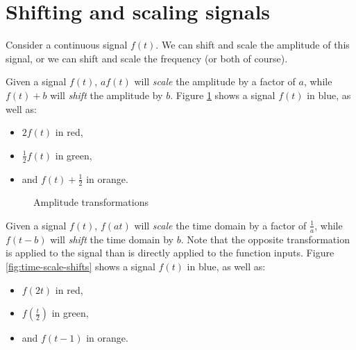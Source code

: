 \documentclass[12pt]{article}
\begin{document}
\section{Shifting and scaling signals}

Consider a continuous signal $f(t)$. We can shift and scale the amplitude of this signal, or we can shift and scale the frequency (or both of course).

Given a signal $f(t)$, $af(t)$ will \emph{scale} the amplitude by a factor of $a$, while $f(t) + b$ will \emph{shift} the amplitude by $b$. Figure \ref{fig:amplitude-scale-shifts} shows a signal $f(t)$ in blue, as well as:
\begin{itemize}
    \item $2f(t)$ in red,
    \item $\frac{1}{2}f(t)$ in green,
    \item and $f(t) + \frac{1}{2}$ in orange.
\end{itemize}

\begin{figure}[ht!]
    \centering
\caption{Amplitude transformations}
\label{fig:amplitude-scale-shifts}
\end{figure}

Given a signal $f(t)$, $f(at)$ will \emph{scale} the time domain by a factor of $\frac{1}{a}$, while $f(t - b)$ will \emph{shift} the time domain by $b$. Note that the opposite transformation is applied to the signal than is directly applied to the function inputs. Figure \ref{fig:time-scale-shifts} shows a signal $f(t)$ in blue, as well as:
\begin{itemize}
    \item $f(2t)$ in red,
    \item $f(\frac{t}{2})$ in green,
    \item and $f(t - 1)$ in orange.
\end{itemize}
\end{document}
